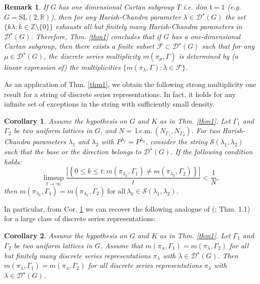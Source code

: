 \documentclass[11 pt]{amsart}
\newcommand{\R}{{\mathbb R}}
\newcommand{\Z}{{\mathbb Z}}
\newtheorem{corollary}{Corollary}[section]
\theoremstyle{definition}
\newtheorem{remark}{Remark}[section]
\numberwithin{equation}{section}
\begin{document}
\vspace{5pt}

\begin{remark}\label{remsl2r}
\textit{If $G$ has one dimensional Cartan subgroup $T$ i.e. dim $\mathfrak{t} =1$ (e.g. $G=\mathrm{SL}(2, \R)$), then for any Harish-Chandra parameter $\lambda \in \mathcal{D}^{\star}(G)$ the set $\{ k \lambda : k \in \Z \setminus \{0\} \}$ 
exhausts all but finitely many Harish-Chandra parameters in $\mathcal{D}^{\star}(G)$. Therefore, Thm. \ref{thm1} concludes that if $G$ has a one-dimensional Cartan subgroup, then there exists a finite subset $\mathcal{F} \subset \mathcal{D}^{\star}(G)$ 
such that for any $\mu \in \mathcal{D}^{\star}(G)$, the discrete series multiplicity $m(\pi_{\mu}, \Gamma)$ is determined by (a linear expression of) the multiplicities $\{ m(\pi_{\lambda}, \Gamma) : \lambda \in \mathcal{F}\}$.}
\end{remark}

\noindent As an application of Thm. \ref{thm1}, we obtain the following strong multiplicity one result for a string of discrete series representations. In fact, it holds for any infinite set of exceptions in the string with sufficiently small density. 

\begin{corollary}\label{cor2}
\textit{Assume the hypothesis on $G$ and $K$ as in Thm. \ref{thm1}. Let $\Gamma_1$ and $\Gamma_2$ be two uniform lattices in $G$, and $N=\ \text{l.c.m.}\ (N_{\Gamma_1}, N_{\Gamma_2})$. For two Harish-Chandra parameters $\lambda_1$ and $\lambda_2$ with $P^{\lambda_1}=P^{\lambda_2}$, consider the string $\mathcal{S}(\lambda_1, \lambda_2)$ such that the base or the direction belongs to $\mathcal{D}^{\star}(G)$. 
If the following condition holds: 
$$ \limsup\limits_{t \rightarrow \infty} \frac{| \left\{ 0 \leq k \leq t : m(\pi_{\lambda_k},\Gamma_1) \neq m(\pi_{\lambda_k},\Gamma_2) \right\}|}{t} < \frac{1}{N},$$
 then $ m(\pi_{\lambda_k},\Gamma_1)=m(\pi_{\lambda_k},\Gamma_2)~ \text{for all}~\lambda_k \in \mathcal{S}(\lambda_1, \lambda_2)$.}
\end{corollary}

\noindent In particular, from Cor. \ref{cor2} we can recover the following analogue of (\cite{BR}; Thm. 1.1) for a large class of discrete series representations:

\begin{corollary}
\textit{Assume the hypothesis on $G$ and $K$ as in Thm. \ref{thm1}. Let $\Gamma_1$ and $\Gamma_2$ be two uniform lattices in $G$. Assume that $m(\pi_{\lambda}, \Gamma_1) = m(\pi_{\lambda}, \Gamma_2)$ for all but finitely many discrete series representations $\pi_{\lambda}$ with $\lambda \in \mathcal{D}^{\star}(G)$. Then $m(\pi_{\lambda}, \Gamma_1) = m(\pi_{\lambda}, \Gamma_2)$ for all discrete series representations $\pi_{\lambda}$ with $\lambda \in \mathcal{D}^{\star}(G)$.} 
\end{corollary}
\end{document}
